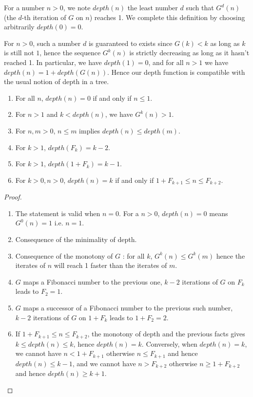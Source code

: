\documentclass[a4paper,11pt]{article}
\begin{document}
\begin{definition}
For a number $n>0$, we note $depth(n)$ the least number $d$ such that
$G^d(n)$ (the $d$-th iteration of $G$ on $n$) reaches 1.
We complete this definition by choosing arbitrarily $depth(0)=0$.
\end{definition}

For $n>0$, such a number $d$ is guaranteed to exists since $G(k)<k$ as long as
$k$ is still not $1$, hence the sequence $G^k(n)$ is strictly
decreasing as long as it hasn't reached 1.
In particular, we have $depth(1)=0$, and for all $n>1$ we have
$depth(n) = 1+depth(G(n))$. Hence our depth function is compatible
with the usual notion of depth in a tree.

\begin{theorem}\label{depthprops}
\noindent
\begin{enumerate}
\item For all $n$, $depth(n)=0$ if and only if $n\le 1$.
\item For $n>1$ and $k<depth(n)$, we have $G^k(n) > 1$.
\item For $n,m>0$, $n\le m$ implies $depth(n)\le depth(m)$.
\item For $k>1$, $depth(F_k) = k-2$.
\item For $k>1$, $depth(1+F_k) = k-1$.
\item For $k>0,n>0$, $depth(n)=k$ if and only if $1+F_{k+1} \leq n \leq
  F_{k+2}$.
\end{enumerate}
\end{theorem}
\begin{proof}
\noindent
\begin{enumerate}
\item The statement is valid when $n=0$. For a $n>0$, 
$depth(n)=0$ means $G^0(n)=1$ i.e. $n=1$.
\item Consequence of the minimality of depth.
\item Consequence of the monotony of $G$ :
  for all $k$, $G^k(n)\le G^k(m)$ hence the iterates of $n$ will reach
  1 faster than the iterates of $m$.
\item $G$ maps a Fibonacci number to the previous one, $k-2$
  iterations of $G$ on $F_k$ leads to $F_2=1$.
\item $G$ maps a successor of a Fibonacci number to the previous such
  number, $k-2$ iterations of $G$ on $1+F_k$ leads to $1+F_2 = 2$.
\item If $1+F_{k+1} \leq n \leq F_{k+2}$, the monotony of depth and the
previous facts gives $k \le depth(n) \le k$, hence $depth(n)=k$.
Conversely, when $depth(n)=k$, we cannot have $n < 1 + F_{k+1}$ otherwise
$n \le F_{k+1}$ and hence $depth(n)\le k-1$, and we cannot have $n > F_{k+2}$
otherwise $n \ge 1+F_{k+2}$ and hence $depth(n)\ge k+1$.
\end{enumerate}
\end{proof}
\end{document}
